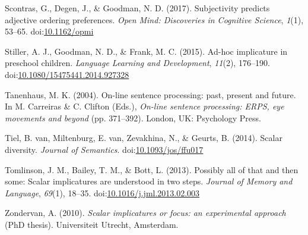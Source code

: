 \documentclass[man]{apa6}
\theoremstyle{definition}
\theoremstyle{definition}
\theoremstyle{definition}
\theoremstyle{remark}
\begin{document}
\hypertarget{ref-Scontras2017}{}
Scontras, G., Degen, J., \& Goodman, N. D. (2017). Subjectivity predicts
adjective ordering preferences. \emph{Open Mind: Discoveries in
Cognitive Science}, \emph{1}(1), 53--65.
doi:\href{https://doi.org/10.1162/opmi}{10.1162/opmi}

\hypertarget{ref-Stiller2015}{}
Stiller, A. J., Goodman, N. D., \& Frank, M. C. (2015). Ad-hoc
implicature in preschool children. \emph{Language Learning and
Development}, \emph{11}(2), 176--190.
doi:\href{https://doi.org/10.1080/15475441.2014.927328}{10.1080/15475441.2014.927328}

\hypertarget{ref-Tanenhaus2004}{}
Tanenhaus, M. K. (2004). On-line sentence processing: past, present and
future. In M. Carreiras \& C. Clifton (Eds.), \emph{On-line sentence
processing: ERPS, eye movements and beyond} (pp. 371--392). London, UK:
Psychology Press.

\hypertarget{ref-VanTiel2014}{}
Tiel, B. van, Miltenburg, E. van, Zevakhina, N., \& Geurts, B. (2014).
Scalar diversity. \emph{Journal of Semantics}.
doi:\href{https://doi.org/10.1093/jos/ffu017}{10.1093/jos/ffu017}

\hypertarget{ref-Tomlinson2013}{}
Tomlinson, J. M., Bailey, T. M., \& Bott, L. (2013). Possibly all of
that and then some: Scalar implicatures are understood in two steps.
\emph{Journal of Memory and Language}, \emph{69}(1), 18--35.
doi:\href{https://doi.org/10.1016/j.jml.2013.02.003}{10.1016/j.jml.2013.02.003}

\hypertarget{ref-Zondervan2010}{}
Zondervan, A. (2010). \emph{Scalar implicatures or focus: an
experimental approach} (PhD thesis). Universiteit Utrecht, Amsterdam.
\end{document}
